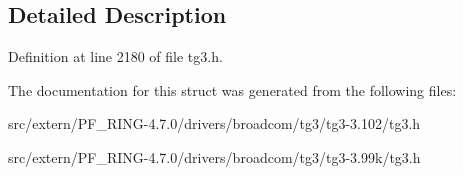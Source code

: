 \subsection{Detailed Description}


Definition at line 2180 of file tg3.h.



The documentation for this struct was generated from the following files:\begin{DoxyCompactItemize}
\item 
src/extern/PF\_\-RING-\/4.7.0/drivers/broadcom/tg3/tg3-\/3.102/tg3.h\item 
src/extern/PF\_\-RING-\/4.7.0/drivers/broadcom/tg3/tg3-\/3.99k/tg3.h\end{DoxyCompactItemize}
